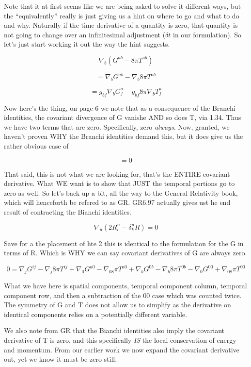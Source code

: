 \documentclass[landscape,letterpaper,10pt,english]{article}
\begin{document}
    Note that it at first seems like we are being asked to solve it
different ways, but the ``equivalently'' really is just giving us a hint
on where to go and what to do and why. Naturally if the time derivative
of a quantity is zero, that quantity is not going to change over an
infinitesimal adjustment (\(\delta t\) in our formulation). So let's
just start working it out the way the hint suggests.

\[ \nabla_b(G^{ab}-8\pi T^{ab}) \]

\[ = \nabla_bG^{ab}- \nabla_b8\pi T^{ab} \]

\[ = g_{bf}\nabla_bG^{a}_f - g_{bf}8\pi \nabla_b T^{a}_f \]

    Now here's the thing, on page 6 we note that as a consequence of the
Branchi identities, the covariant divergence of G vanishe AND so does T,
via 1.34. Thus we have two terms that are zero. Specifically, zero
\emph{always}. Now, granted, we haven't proven WHY the Branchi
identities demand this, but it does give us the rather obvious case of

\[ = 0 \]

That said, this is not what we are looking for, that's the ENTIRE
covariant derivative. What WE want is to show that JUST the temporal
portions go to zero as well. So let's back up a bit, all the way to the
General Relativity book, which will henceforth be refered to as GR.
GR6.97 actually gives ust he end result of contracting the Bianchi
identities.

\[ \nabla_u(2R^u_l-\delta^u_kR) = 0 \]

Save for a the placement of hte 2 this is identical to the formulation
for the G in terms of R. Which is WHY we can say covariant derivatives
of G are always zero.

\[ 0 = \nabla_jG^{ij}- \nabla_j8\pi T^{ij} + \nabla_0G^{a0}- \nabla_08\pi T^{a0} + \nabla_bG^{0b}- \nabla_b8\pi T^{0b} - \nabla_0G^{00} + \nabla_08\pi T^{00} \]

What we have here is spatial components, temporal component column,
temporal component row, and then a subtraction of the 00 case which was
counted twice. The symmetry of G and T does not allow us to simplify as
the derivative on identical components relies on a potentially different
variable.

    We also note from GR that the Bianchi identities also imply the
covariant derivative of T is zero, and this specifically \emph{IS} the
local conservation of energy and momentum. From our earlier work we now
expand the covariant derivative out, yet we know it must be zero still.
\end{document}
